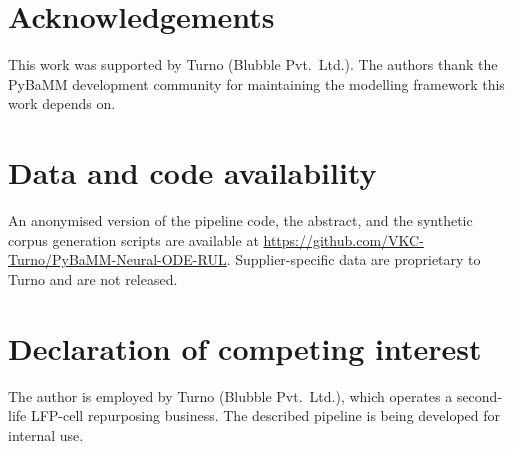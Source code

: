 \documentclass[preprint,12pt,3p,authoryear]{elsarticle}
\begin{document}
\section*{Acknowledgements}
This work was supported by Turno (Blubble Pvt.\ Ltd.). The authors thank
the PyBaMM development community for maintaining the modelling
framework this work depends on.

\section*{Data and code availability}
An anonymised version of the pipeline code, the abstract, and the
synthetic corpus generation scripts are available at
\url{https://github.com/VKC-Turno/PyBaMM-Neural-ODE-RUL}. Supplier-specific
data are proprietary to Turno and are not released.

\section*{Declaration of competing interest}
The author is employed by Turno (Blubble Pvt.\ Ltd.), which operates a
second-life LFP-cell repurposing business. The described pipeline is
being developed for internal use.
\end{document}
